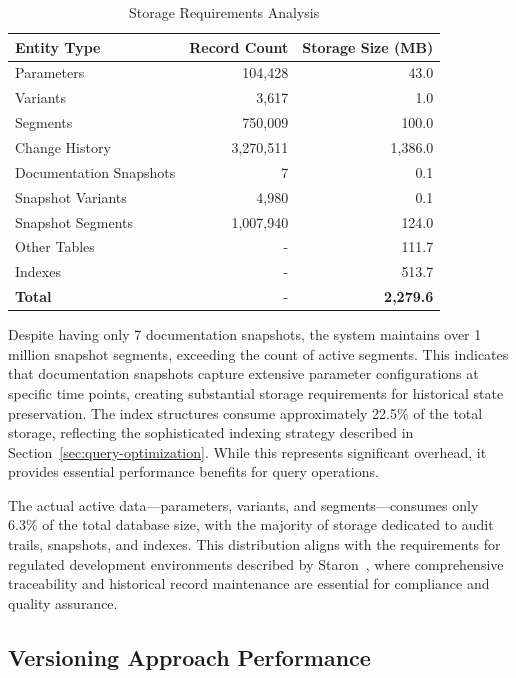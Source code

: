 \begin{table}[h]
\centering
\caption{Storage Requirements Analysis}
\label{tab:storage-requirements}
\begin{tabular}{|l|r|r|}
\hline
\textbf{Entity Type} & \textbf{Record Count} & \textbf{Storage Size (MB)} \\
\hline
Parameters & 104,428 & 43.0 \\
\hline
Variants & 3,617 & 1.0 \\
\hline
Segments & 750,009 & 100.0 \\
\hline
Change History & 3,270,511 & 1,386.0 \\
\hline
Documentation Snapshots & 7 & 0.1 \\
\hline
Snapshot Variants & 4,980 & 0.1 \\
\hline
Snapshot Segments & 1,007,940 & 124.0 \\
\hline
Other Tables & - & 111.7 \\
\hline
Indexes & - & 513.7 \\
\hline
\textbf{Total} & - & \textbf{2,279.6} \\
\hline
\end{tabular}
\end{table}

Despite having only 7 documentation snapshots, the system maintains over 1 million snapshot segments, exceeding the count of active segments. This indicates that documentation snapshots capture extensive parameter configurations at specific time points, creating substantial storage requirements for historical state preservation. The index structures consume approximately 22.5\% of the total storage, reflecting the sophisticated indexing strategy described in Section~\ref{sec:query-optimization}. While this represents significant overhead, it provides essential performance benefits for query operations.

The actual active data—parameters, variants, and segments—consumes only 6.3\% of the total database size, with the majority of storage dedicated to audit trails, snapshots, and indexes. This distribution aligns with the requirements for regulated development environments described by Staron~\cite{staron2021automotive}, where comprehensive traceability and historical record maintenance are essential for compliance and quality assurance.

\subsection{Versioning Approach Performance}
\label{subsec:versioning-approach-performance}

